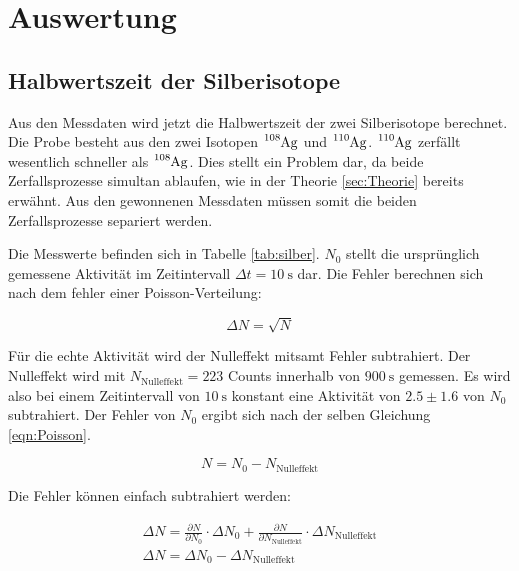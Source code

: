 \section{Auswertung}
\label{sec:Auswertung}

\subsection{Halbwertszeit der Silberisotope}
\label{sec:Silberhalbwertszeit}

Aus den Messdaten wird jetzt die Halbwertszeit der zwei Silberisotope berechnet.
Die Probe besteht aus den zwei Isotopen $\ce{^{108}Ag}$ und $\ce{^{110}Ag}$.
$\ce{^{110}Ag}$ zerfällt wesentlich schneller als $\ce{^{108}Ag}$.
Dies stellt ein Problem dar, da beide Zerfallsprozesse simultan ablaufen, wie in der Theorie \ref{sec:Theorie} bereits erwähnt.
Aus den gewonnenen Messdaten müssen somit die beiden Zerfallsprozesse separiert werden.

Die Messwerte befinden sich in Tabelle \ref{tab:silber}.
$N_0$ stellt die ursprünglich gemessene Aktivität im Zeitintervall $\Delta t = \SI{10}{\second}$ dar.
Die Fehler berechnen sich nach dem fehler einer Poisson-Verteilung:

\begin{equation}
  \Delta N = \sqrt{N}
  \label{eqn:Poisson}
\end{equation}

Für die echte Aktivität wird der Nulleffekt mitsamt Fehler subtrahiert.
Der Nulleffekt wird mit $N_\text{Nulleffekt} = 223$ Counts innerhalb von $\SI{900}{\second}$ gemessen.
Es wird also bei einem Zeitintervall von $\SI{10}{\second}$ konstant eine Aktivität von $2.5\pm1.6$ von $N_0$ subtrahiert.
Der Fehler von $N_0$ ergibt sich nach der selben Gleichung \eqref{eqn:Poisson}.

\begin{equation}
  N = N_0 - N_{\text{Nulleffekt}}
  \label{eqn:nulleffekt}
\end{equation}

Die Fehler können einfach subtrahiert werden:

\begin{gather}
    \Delta N = \frac{\partial N}{\partial N_0} \cdot \Delta N_0 + \frac{\partial N}{\partial N_{\text{Nulleffekt}}} \cdot \Delta N_{\text{Nulleffekt}} \\
    \Delta N = \Delta N_0 - \Delta N_{\text{Nulleffekt}}
    \label{eqn:nfehler}
\end{gather}


